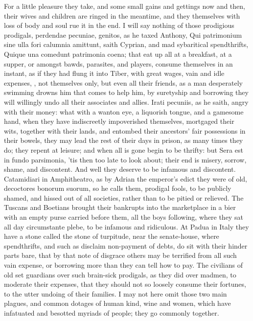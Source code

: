 {For a little pleasure they take, and some small gains and gettings now
and then, their wives and children are ringed in the meantime, and they
themselves with loss of body and soul rue it in the end. I will say
nothing of those prodigious prodigals, perdendae pecuniae, genitos, as
he  taxed Anthony, Qui patrimonium sine ulla fori calumnia
amittunt, saith Cyprian, and mad sybaritical spendthrifts,
Quique una comedunt patrimonia coena; that eat up all at a breakfast,
at a supper, or amongst bawds, parasites, and players, consume
themselves in an instant, as if they had flung it into Tiber,
with great wages, vain and idle expenses, \etc{}, not themselves only, but
even all their friends, as a man desperately swimming drowns him that
comes to help him, by suretyship and borrowing they will willingly undo
all their associates and allies.  Irati pecuniis, as he saith,
angry with their money: what with a wanton eye, a liquorish
tongue, and a gamesome hand, when they have indiscreetly impoverished
themselves, mortgaged their wits, together with their lands, and
entombed their ancestors' fair possessions in their bowels, they may
lead the rest of their days in prison, as many times they do; they
repent at leisure; and when all is gone begin to be thrifty: but Sera
est in fundo parsimonia, 'tis then too late to look about; their
end is misery, sorrow, shame, and discontent. And well they
deserve to be infamous and discontent. Catamidiari in
Amphitheatro, as by Adrian the emperor's edict they were of old,
decoctores bonorum suorum, so he calls them, prodigal fools, to be
publicly shamed, and hissed out of all societies, rather than to be
pitied or relieved. The Tuscans and Boetians brought their
bankrupts into the marketplace in a bier with an empty purse carried
before them, all the boys following, where they sat all day
circumstante plebe, to be infamous and ridiculous. At Padua in
Italy they have a stone called the stone of turpitude, near the
senate-house, where spendthrifts, and such as disclaim non-payment of
debts, do sit with their hinder parts bare, that by that note of
disgrace others may be terrified from all such vain expense, or
borrowing more than they can tell how to pay. The civilians of
old set guardians over such brain-sick prodigals, as they did over
madmen, to moderate their expenses, that they should not so loosely
consume their fortunes, to the utter undoing of their families.
I may not here omit those two main plagues, and common dotages of human
kind, wine and women, which have infatuated and besotted myriads of
people; they go commonly together.

}

